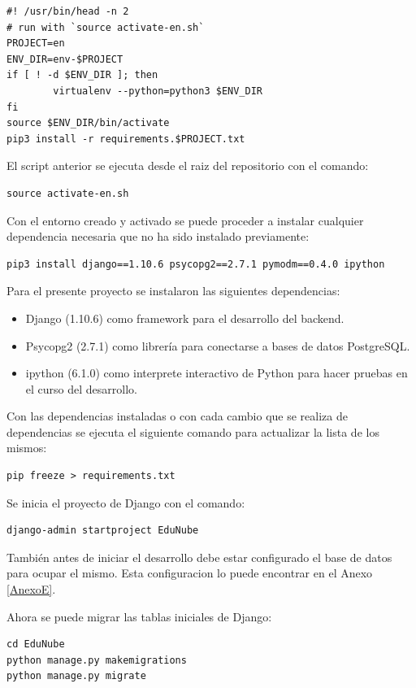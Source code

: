 \begin{lstlisting}
#! /usr/bin/head -n 2
# run with `source activate-en.sh`
PROJECT=en
ENV_DIR=env-$PROJECT
if [ ! -d $ENV_DIR ]; then
        virtualenv --python=python3 $ENV_DIR
fi
source $ENV_DIR/bin/activate
pip3 install -r requirements.$PROJECT.txt
\end{lstlisting}

El script anterior se ejecuta desde el raiz del repositorio con el comando:

\begin{lstlisting}
source activate-en.sh
\end{lstlisting}

Con el entorno creado y activado se puede proceder a instalar cualquier dependencia necesaria que no ha sido instalado previamente:

\begin{lstlisting}[breaklines]
pip3 install django==1.10.6 psycopg2==2.7.1 pymodm==0.4.0 ipython
\end{lstlisting}

Para el presente proyecto se instalaron las siguientes dependencias:
\begin{itemize}
	\item Django (1.10.6) como framework para el desarrollo del backend.
    \item Psycopg2 (2.7.1) como librería para conectarse a bases de datos PostgreSQL.
    \item ipython (6.1.0) como interprete interactivo de Python para hacer pruebas en el curso del desarrollo.
\end{itemize}

Con las dependencias instaladas o con cada cambio que se realiza de dependencias se ejecuta el siguiente comando para actualizar la lista de los mismos:

\begin{lstlisting}
pip freeze > requirements.txt
\end{lstlisting}

Se inicia el proyecto de Django con el comando:

\begin{lstlisting}
django-admin startproject EduNube
\end{lstlisting}

También antes de iniciar el desarrollo debe estar configurado el base de datos para ocupar el mismo. Esta configuracion lo puede encontrar en el Anexo \ref{AnexoE}.

Ahora se puede migrar las tablas iniciales de Django:
\begin{lstlisting}
cd EduNube
python manage.py makemigrations
python manage.py migrate
\end{lstlisting}

